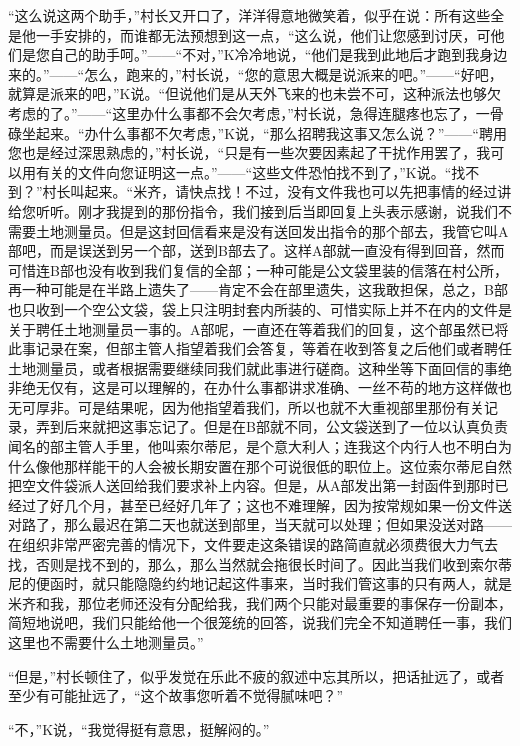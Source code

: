 \documentclass[12pt,a4paper]{article}
\begin{document}
“这么说这两个助手，”村长又开口了，洋洋得意地微笑着，似乎在说：所有这些全是他一手安排的，而谁都无法预想到这一点，“这么说，他们让您感到讨厌，可他们是您自己的助手呵。”——“不对，”K冷冷地说，“他们是我到此地后才跑到我身边来的。”——“怎么，跑来的，”村长说，“您的意思大概是说派来的吧。”——“好吧，就算是派来的吧，”K说。“但说他们是从天外飞来的也未尝不可，这种派法也够欠考虑的了。”——“这里办什么事都不会欠考虑，”村长说，急得连腿疼也忘了，一骨碌坐起来。“办什么事都不欠考虑，”K说，“那么招聘我这事又怎么说？”——“聘用您也是经过深思熟虑的，”村长说，“只是有一些次要因素起了干扰作用罢了，我可以用有关的文件向您证明这一点。”——“这些文件恐怕找不到了，”K说。“找不到？”村长叫起来。“米齐，请快点找！不过，没有文件我也可以先把事情的经过讲给您听听。刚才我提到的那份指令，我们接到后当即回复上头表示感谢，说我们不需要土地测量员。但是这封回信看来是没有送回发出指令的那个部去，我管它叫A部吧，而是误送到另一个部，送到B部去了。这样A部就一直没有得到回音，然而可惜连B部也没有收到我们复信的全部；一种可能是公文袋里装的信落在村公所，再一种可能是在半路上遗失了——肯定不会在部里遗失，这我敢担保，总之，B部也只收到一个空公文袋，袋上只注明封套内所装的、可惜实际上并不在内的文件是关于聘任土地测量员一事的。A部呢，一直还在等着我们的回复，这个部虽然已将此事记录在案，但部主管人指望着我们会答复，等着在收到答复之后他们或者聘任土地测量员，或者根据需要继续同我们就此事进行磋商。这种坐等下面回信的事绝非绝无仅有，这是可以理解的，在办什么事都讲求准确、一丝不苟的地方这样做也无可厚非。可是结果呢，因为他指望着我们，所以也就不大重视部里那份有关记录，弄到后来就把这事忘记了。但是在B部就不同，公文袋送到了一位以认真负责闻名的部主管人手里，他叫索尔蒂尼，是个意大利人；连我这个内行人也不明白为什么像他那样能干的人会被长期安置在那个可说很低的职位上。这位索尔蒂尼自然把空文件袋派人送回给我们要求补上内容。但是，从A部发出第一封函件到那时已经过了好几个月，甚至已经好几年了；这也不难理解，因为按常规如果一份文件送对路了，那么最迟在第二天也就送到部里，当天就可以处理；但如果没送对路——在组织非常严密完善的情况下，文件要走这条错误的路简直就必须费很大力气去找，否则是找不到的，那么，那么当然就会拖很长时间了。因此当我们收到索尔蒂尼的便函时，就只能隐隐约约地记起这件事来，当时我们管这事的只有两人，就是米齐和我，那位老师还没有分配给我，我们两个只能对最重要的事保存一份副本，简短地说吧，我们只能给他一个很笼统的回答，说我们完全不知道聘任一事，我们这里也不需要什么土地测量员。”



“但是，”村长顿住了，似乎发觉在乐此不疲的叙述中忘其所以，把话扯远了，或者至少有可能扯远了，“这个故事您听着不觉得腻味吧？”



“不，”K说，“我觉得挺有意思，挺解闷的。”
\end{document}
